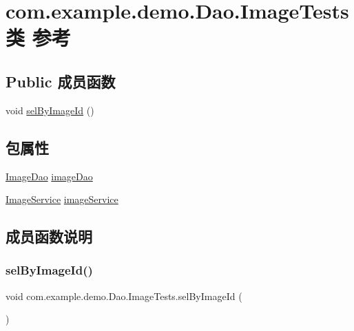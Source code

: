 \hypertarget{classcom_1_1example_1_1demo_1_1_dao_1_1_image_tests}{}\section{com.\+example.\+demo.\+Dao.\+Image\+Tests类 参考}
\label{classcom_1_1example_1_1demo_1_1_dao_1_1_image_tests}
\subsection*{Public 成员函数}
\begin{DoxyCompactItemize}
\item 
void \mbox{\hyperlink{classcom_1_1example_1_1demo_1_1_dao_1_1_image_tests_ac756513bf27e438e9937829f41a8a92f}{sel\+By\+Image\+Id}} ()
\end{DoxyCompactItemize}
\subsection*{包属性}
\begin{DoxyCompactItemize}
\item 
\mbox{\hyperlink{interfacecom_1_1example_1_1demo_1_1dao_1_1_image_dao}{Image\+Dao}} \mbox{\hyperlink{classcom_1_1example_1_1demo_1_1_dao_1_1_image_tests_ae8e290de679af5137b7996fb2d521d74}{image\+Dao}}
\item 
\mbox{\hyperlink{classcom_1_1example_1_1demo_1_1service_1_1_image_service}{Image\+Service}} \mbox{\hyperlink{classcom_1_1example_1_1demo_1_1_dao_1_1_image_tests_a7fffc5f9e3d9729b406d241459452671}{image\+Service}}
\end{DoxyCompactItemize}


\subsection{成员函数说明}
\mbox{\label{classcom_1_1example_1_1demo_1_1_dao_1_1_image_tests_ac756513bf27e438e9937829f41a8a92f}} 
\subsubsection{\texorpdfstring{sel\+By\+Image\+Id()}{selByImageId()}}
{\footnotesize\ttfamily void com.\+example.\+demo.\+Dao.\+Image\+Tests.\+sel\+By\+Image\+Id (\begin{DoxyParamCaption}{ }\end{DoxyParamCaption})}



